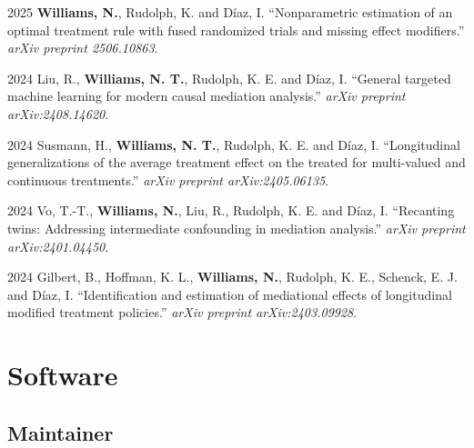\documentclass[12pt,letterpaper]{report}
\begin{document}
    \begin{tablist}
    
     \item[2025] \tab \textbf{Williams, N.}, Rudolph, K. and Díaz, I. \enquote{Nonparametric estimation of an optimal treatment rule with fused randomized trials and missing effect modifiers.} \textit{arXiv preprint 2506.10863}.
    
    \item[2024] \tab Liu, R., \textbf{Williams, N. T.}, Rudolph, K. E. and Díaz, I. \enquote{General targeted machine learning for modern causal mediation analysis.} \textit{arXiv preprint arXiv:2408.14620}.
    
    \item[2024] \tab Susmann, H., \textbf{Williams, N. T.}, Rudolph, K. E. and Díaz, I. \enquote{Longitudinal generalizations of the average treatment effect on the treated for multi-valued and continuous treatments.} \textit{arXiv preprint arXiv:2405.06135}.
    
    \item[2024] \tab Vo, T.-T., \textbf{Williams, N.}, Liu, R., Rudolph, K. E. and Díaz, I. \enquote{Recanting twins: Addressing intermediate confounding in mediation analysis.} \textit{arXiv preprint arXiv:2401.04450}.
    
    \item[2024] \tab Gilbert, B., Hoffman, K. L., \textbf{Williams, N.}, Rudolph, K. E., Schenck, E. J. and Díaz, I. \enquote{Identification and estimation of mediational effects of longitudinal modified treatment policies.} \textit{arXiv preprint arXiv:2403.09928}.

    
    \end{tablist}
    
    \section*{Software}
    
    \subsection*{Maintainer}
    
\end{document}
